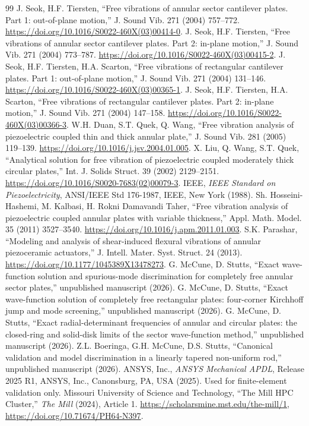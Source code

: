 \documentclass[11pt]{article}
\begin{document}
\begin{thebibliography}{99}\small
\setlength{\itemsep}{0pt}
\setlength{\parsep}{0pt}
 J. Seok, H.F. Tiersten, ``Free vibrations of annular sector
cantilever plates. Part 1: out-of-plane motion,'' J. Sound Vib. 271 (2004)
757--772. \url{https://doi.org/10.1016/S0022-460X(03)00414-0}.
 J. Seok, H.F. Tiersten, ``Free vibrations of annular sector
cantilever plates. Part 2: in-plane motion,'' J. Sound Vib. 271 (2004)
773--787. \url{https://doi.org/10.1016/S0022-460X(03)00415-2}.
 J. Seok, H.F. Tiersten, H.A. Scarton, ``Free vibrations of
rectangular cantilever plates. Part 1: out-of-plane motion,'' J. Sound
Vib. 271 (2004) 131--146. \url{https://doi.org/10.1016/S0022-460X(03)00365-1}.
 J. Seok, H.F. Tiersten, H.A. Scarton, ``Free vibrations of
rectangular cantilever plates. Part 2: in-plane motion,'' J. Sound Vib.
271 (2004) 147--158. \url{https://doi.org/10.1016/S0022-460X(03)00366-3}.
 W.H. Duan, S.T. Quek, Q. Wang, ``Free vibration analysis
of piezoelectric coupled thin and thick annular plate,'' J. Sound Vib. 281
(2005) 119--139. \url{https://doi.org/10.1016/j.jsv.2004.01.005}.
 X. Liu, Q. Wang, S.T. Quek, ``Analytical solution for free
vibration of piezoelectric coupled moderately thick circular plates,''
Int. J. Solids Struct. 39 (2002) 2129--2151.
\url{https://doi.org/10.1016/S0020-7683(02)00079-3}.
 IEEE, \emph{IEEE Standard on Piezoelectricity}, ANSI/IEEE
Std 176-1987, IEEE, New York (1988).
 Sh. Hosseini-Hashemi, M. Kalbasi, H. Rokni Damavandi
Taher, ``Free vibration analysis of piezoelectric coupled annular plates
with variable thickness,'' Appl. Math. Model. 35 (2011) 3527--3540.
\url{https://doi.org/10.1016/j.apm.2011.01.003}.
 S.K. Parashar, ``Modeling and analysis of
shear-induced flexural vibrations of annular piezoceramic actuators,''
J. Intell. Mater. Syst. Struct. 24 (2013).
\url{https://doi.org/10.1177/1045389X13478273}.
 G. McCune, D. Stutts, ``Exact wave-function
solution and spurious-mode discrimination for completely free annular sector
plates,'' unpublished manuscript (2026).
 G. McCune, D. Stutts, ``Exact wave-function solution
of completely free rectangular plates: four-corner Kirchhoff jump and mode
screening,'' unpublished manuscript (2026).
 G. McCune, D. Stutts, ``Exact radial-determinant
frequencies of annular and circular plates: the closed-ring and solid-disk
limits of the sector wave-function method,'' unpublished manuscript (2026).
 Z.L. Boeringa, G.H. McCune, D.S. Stutts, ``Canonical
validation and model discrimination in a linearly tapered non-uniform rod,''
unpublished manuscript (2026).
 ANSYS, Inc., \emph{ANSYS Mechanical APDL}, Release 2025 R1,
ANSYS, Inc., Canonsburg, PA, USA (2025). Used for finite-element validation
only.
 Missouri University of Science and Technology, ``The Mill
HPC Cluster,'' \emph{The Mill} (2024), Article 1.
\url{https://scholarsmine.mst.edu/the-mill/1},
\url{https://doi.org/10.71674/PH64-N397}.
\end{thebibliography}
\end{document}
